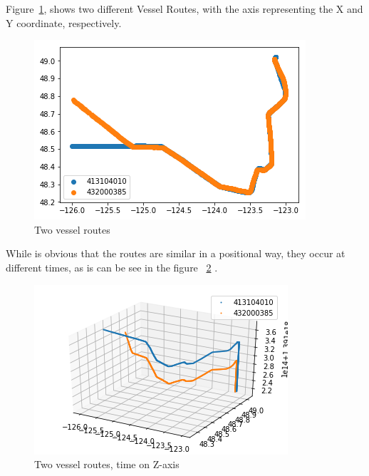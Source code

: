 Figure~\ref{fig: VesselRendevouz2d}, shows two different Vessel Routes, with the axis representing the X and Y coordinate, respectively.

\begin{figure}[H]
	\centering
	\includegraphics[scale = .8]{figures/VesselRendevouz2d}
    \caption{Two vessel routes}
    \label{fig: VesselRendevouz2d}
\end{figure}

While is obvious that the routes are similar in a positional way, they occur at different times, as is can be see in the figure ~\ref{fig: VesselRendevouz3d} .

\begin{figure}[H]
	\centering
	\includegraphics[scale = .9]{figures/VesselRendevouz3d}
    \caption{Two vessel routes, time on Z-axis}
    \label{fig: VesselRendevouz3d}
\end{figure}


   



